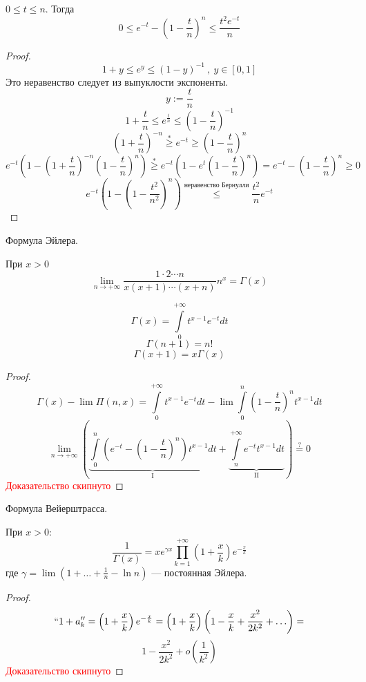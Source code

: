 \begin{lemma}
    $0\le t\le n$. Тогда
    $$0\le e^{-t} - \left(1-\frac{t}{n}\right)^n \le \frac{t^2e^{-t}}{n}$$
\end{lemma}
\begin{proof}
    $$1+y\le e^y \le (1-y)^{-1}\ ,\ y\in[0,1]$$
    Это неравенство следует из выпуклости экспоненты.
    $$y:=\frac{t}{n}$$
    $$1+\frac{t}{n}\le e^{\frac{t}{n}} \le \left(1-\frac{t}{n}\right)^{-1}$$
    $$\left(1+\frac{t}{n}\right)^{-n} \stackrel{*}{\ge} e^{-t} \ge \left(1-\frac{t}{n}\right)^{n}$$
    $$e^{-t}\left(1 - \left(1+\frac{t}{n}\right)^{-n}\left(1-\frac{t}{n}\right)^n\right) \stackrel{*}{\ge} e^{-t}\left(1 - e^t\left(1-\frac{t}{n}\right)^n\right) = e^{-t} - \left(1-\frac{t}{n}\right)^{n} \ge 0$$
    $$e^{-t}\left(1 -\left(1-\frac{t^2}{n^2}\right)^n\right) \stackrel{\text{неравенство Бернулли}}{\le} \frac{t^2}{n}e^{-t}$$
\end{proof}

\begin{theorem}
    Формула Эйлера.

    При $x>0$ $$\lim_{n\to+\infty} \frac{1\cdot2\cdots n}{x(x+1)\cdots(x+n)}n^x=\Gamma(x)$$
\end{theorem}
\begin{remark}
    $$\Gamma(x)=\int\limits_0^{+\infty}t^{x-1}e^{-t}dt$$
    $$\Gamma(n+1)=n!$$
    $$\Gamma(x+1)=x\Gamma(x)$$
\end{remark}
\begin{proof}
    $$\Gamma(x) - \lim\Pi(n, x) = \int\limits_0^{+\infty} t^{x-1}e^{-t}dt - \lim\int\limits_0^n \left(1-\frac{t}{n}\right)^n t^{x-1}dt$$
    $$\lim_{n\to+\infty}\left(\underbrace{\int\limits_0^n\left(e^{-t}-\left(1-\frac{t}{n}\right)^n\right) t^{x-1} dt}_{\text{I}} + \underbrace{\int\limits_{n}^{+\infty} e^{-t}t^{x-1}dt}_{\text{II}}\right)\stackrel{?}{=}0$$
    \textcolor{red}{Доказательство скипнуто}
\end{proof}

\begin{theorem}
    Формула Вейерштрасса.

    При $x>0$:
    $$\frac{1}{\Gamma(x)} = x e^{\gamma x} \prod_{k=1}^{+\infty}\left(1+\frac{x}{k}\right)e^{-\frac{x}{k}}$$
    где $\gamma = \lim(1+\ldots+\frac{1}{n}-\ln n)$ --- постоянная Эйлера. 
\end{theorem}
\begin{proof}
    $$``1+a_k''=\left(1+\frac{x}{k}\right)e^{-\frac{x}{k}} = \left(1+\frac{x}{k}\right)\left(1-\frac{x}{k}+\frac{x^2}{2k^2}+\ldots\right)=$$
    $$1-\frac{x^2}{2k^2}+o(\frac{1}{k^2})$$
    \textcolor{red}{Доказательство скипнуто}
\end{proof}

